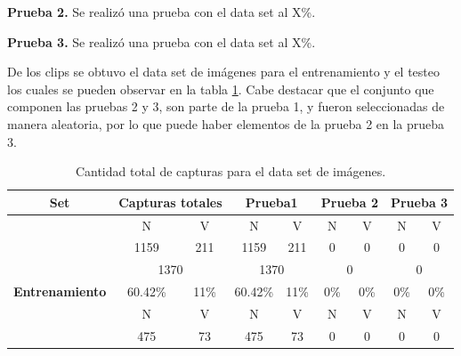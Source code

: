 \documentclass[twoside,spanish,ESP,MSc]{plantillaLabUPV}
\theoremstyle{definition}
\begin{document}
\checkmark\textbf{Prueba 2.} Se realizó una prueba con el data set al X\%.

\checkmark\textbf{Prueba 3.} Se realizó una prueba con el data set al X\%.


De los clips se obtuvo el data set de imágenes para el entrenamiento y el testeo los cuales se pueden observar en la tabla \ref{imadat}. Cabe destacar que el conjunto que componen las pruebas 2 y 3, son parte de la prueba 1, y fueron seleccionadas de manera aleatoria, por lo que puede haber elementos de la prueba 2 en la prueba 3.

\begin{table}[h]
	\caption{Cantidad total de capturas para el data set de imágenes.}
	\label{imadat}
	\centering
	\begin{tabular}{|c|c|c|c|c|c|c|c|c|}
		\hline
		\textbf{Set}                               & \multicolumn{2}{c|}{\textbf{Capturas totales}}      & \multicolumn{2}{c|}{\textbf{Prueba1}}               & \multicolumn{2}{c|}{\textbf{Prueba 2}}              & \multicolumn{2}{c|}{\textbf{Prueba 3}}              \\ \hline
		& {\color[HTML]{F56B00} N} & {\color[HTML]{009901} V} & {\color[HTML]{F56B00} N} & {\color[HTML]{009901} V} & {\color[HTML]{F56B00} N} & {\color[HTML]{009901} V} & {\color[HTML]{F56B00} N} & {\color[HTML]{009901} V} \\ \cline{2-9} 
		& 1159                     & 211                      & 1159                     & 211                      & 0                        & 0                        & 0                        & 0                        \\
		\cline{2-9} 
		& \multicolumn{2}{c|}{1370}                           & \multicolumn{2}{c|}{1370}                           & \multicolumn{2}{c|}{0}                           & \multicolumn{2}{c|}{0}                           \\ \cline{2-9} 
		\multirow{-4}{*}{\textbf{Entrenamiento}}   & 60.42\%                  & 11\%                   & 60.42\%                  & 11\%                   & 0\%                      & 0\%                      & 0\%                      & 0\%                      \\ \hline
		& {\color[HTML]{F56B00} N} & {\color[HTML]{009901} V} & {\color[HTML]{F56B00} N} & {\color[HTML]{009901} V} & {\color[HTML]{F56B00} N} & {\color[HTML]{009901} V} & {\color[HTML]{F56B00} N} & {\color[HTML]{009901} V} \\ \cline{2-9} 
		& 475                      & 73                       & 475                      & 73                       & 0                        & 0                        & 0                        & 0                        \\

\end{tabular}
\end{table}
\end{document}
